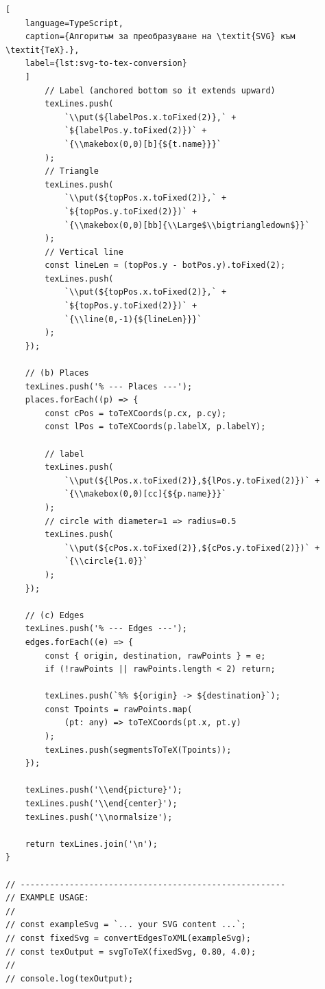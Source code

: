 \begin{lstlisting}[
	language=TypeScript,
	caption={Алгоритъм за преобразуване на \textit{SVG} към \textit{TeX}.},
	label={lst:svg-to-tex-conversion}
	]
        // Label (anchored bottom so it extends upward)
        texLines.push(
            `\\put(${labelPos.x.toFixed(2)},` +
            `${labelPos.y.toFixed(2)})` +
            `{\\makebox(0,0)[b]{${t.name}}}`
        );
        // Triangle
        texLines.push(
            `\\put(${topPos.x.toFixed(2)},` + 
            `${topPos.y.toFixed(2)})` +
            `{\\makebox(0,0)[bb]{\\Large$\\bigtriangledown$}}`
        );
        // Vertical line
        const lineLen = (topPos.y - botPos.y).toFixed(2);
        texLines.push(
            `\\put(${topPos.x.toFixed(2)},` + 
            `${topPos.y.toFixed(2)})` +
            `{\\line(0,-1){${lineLen}}}`
        );
    });
    
    // (b) Places
    texLines.push('% --- Places ---');
    places.forEach((p) => {
        const cPos = toTeXCoords(p.cx, p.cy);
        const lPos = toTeXCoords(p.labelX, p.labelY);

        // label
        texLines.push(
            `\\put(${lPos.x.toFixed(2)},${lPos.y.toFixed(2)})` + 
            `{\\makebox(0,0)[cc]{${p.name}}}`
        );
        // circle with diameter=1 => radius=0.5
        texLines.push(
            `\\put(${cPos.x.toFixed(2)},${cPos.y.toFixed(2)})` + 
            `{\\circle{1.0}}`
        );
    });
    
    // (c) Edges
    texLines.push('% --- Edges ---');
    edges.forEach((e) => {
        const { origin, destination, rawPoints } = e;
        if (!rawPoints || rawPoints.length < 2) return;
        
        texLines.push(`%% ${origin} -> ${destination}`);
        const Tpoints = rawPoints.map(
            (pt: any) => toTeXCoords(pt.x, pt.y)
        );
        texLines.push(segmentsToTeX(Tpoints));
    });
    
    texLines.push('\\end{picture}');
    texLines.push('\\end{center}');
    texLines.push('\\normalsize');
    
    return texLines.join('\n');
}

// ------------------------------------------------------
// EXAMPLE USAGE:
//
// const exampleSvg = `... your SVG content ...`;
// const fixedSvg = convertEdgesToXML(exampleSvg);
// const texOutput = svgToTeX(fixedSvg, 0.80, 4.0);
//
// console.log(texOutput);
\end{lstlisting}

